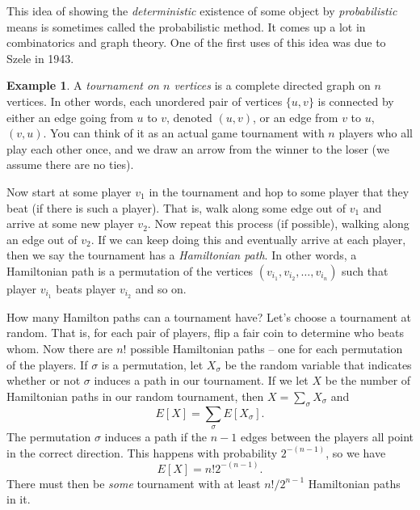 \documentclass[12pt]{article}
\theoremstyle{plain}
\theoremstyle{definition}
\newtheorem{example}[theorem]{Example}
\theoremstyle{remark}
\begin{document}
This idea of showing the \emph{deterministic} existence of some object by \emph{probabilistic} means is sometimes called the probabilistic method.
It comes up a lot in combinatorics and graph theory.
One of the first uses of this idea was due to Szele in 1943.

\begin{example}
    A \emph{tournament on $n$ vertices} is a complete directed graph on $n$ vertices.
    In other words, each unordered pair of vertices $\{u,v\}$ is connected by either an edge going from $u$ to $v$, denoted $(u,v)$, or an edge from $v$ to $u$, $(v,u)$.
    You can think of it as an actual game tournament with $n$ players who all play each other once, and we draw an arrow from the winner to the loser (we assume there are no ties).

    Now start at some player $v_1$ in the tournament and hop to some player that they beat (if there is such a player).
    That is, walk along some edge out of $v_1$ and arrive at some new player $v_2$.
    Now repeat this process (if possible), walking along an edge out of $v_2$.
    If we can keep doing this and eventually arrive at each player, then we say the tournament has a \emph{Hamiltonian path}.
    In other words, a Hamiltonian path is a permutation of the vertices $(v_{i_1}, v_{i_2}, \ldots, v_{i_n})$ such that player $v_{i_1}$ beats player $v_{i_2}$ and so on.

    How many Hamilton paths can a tournament have?
    Let's choose a tournament at random.
    That is, for each pair of players, flip a fair coin to determine who beats whom.
    Now there are $n!$ possible Hamiltonian paths -- one for each permutation of the players.
    If $\sigma$ is a permutation, let $X_\sigma$ be the random variable that indicates whether or not $\sigma$ induces a path in our tournament.
    If we let $X$ be the number of Hamiltonian paths in our random tournament, then $X = \sum_{\sigma}X_\sigma$ and
    \[
        E[X] = \sum_\sigma E[X_\sigma].
    \]
    The permutation $\sigma$ induces a path if the $n-1$ edges between the players all point in the correct direction.
    This happens with probability $2^{-(n-1)}$, so we have
    \[
        E[X] = n!2^{-(n-1)}.
    \]
    There must then be \emph{some} tournament with at least $n!/2^{n-1}$ Hamiltonian paths in it.
\end{example}
\end{document}
